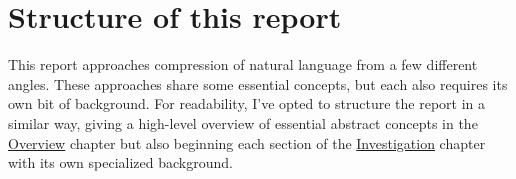\section{Structure of this report}
This report approaches compression of natural language from a few different angles. These approaches share some essential concepts, but each also requires its own bit of background. For readability, I've opted to structure the report in a similar way, giving a high-level overview of essential abstract concepts in the \hyperref[chap:overview]{Overview} chapter but also beginning each section of the \hyperref[chap:investigation]{Investigation} chapter with its own specialized background.